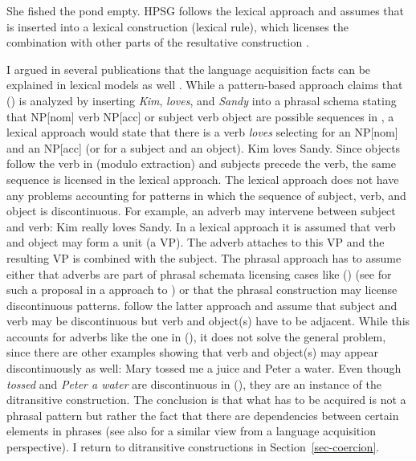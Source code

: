 \documentclass[output=paper,biblatex,babelshorthands,newtxmath,draftmode,colorlinks,citecolor=brown]{langscibook}
\begin{document}
\ea
She fished the pond empty.
\z
HPSG follows the lexical approach and assumes that  is inserted into a lexical
construction (lexical rule), which licenses the combination with other parts of the resultative
construction \citep[Section~5.2]{Mueller2002b}.

I argued in several publications that the language acquisition facts can be explained in lexical
models as well \parencites[Section~6.3]{MuellerPersian}[Section~9]{MWArgSt}. While a pattern-based approach claims that () is
analyzed by inserting \emph{Kim}, \emph{loves}, and \emph{Sandy} into a phrasal schema stating that
NP[nom] verb NP[acc] or subject verb object are possible sequences in , a lexical approach
would state that there is a verb \emph{loves} selecting for an NP[nom] and an NP[acc] (or for a
subject and an object).
\ea
Kim loves Sandy.
\z
Since objects follow the verb in  (modulo extraction) and subjects precede the verb, the same
sequence is licensed in the lexical approach. The lexical approach does not have any problems
accounting for patterns in which the sequence of subject, verb, and object is discontinuous. For
example, an adverb may intervene between subject and verb:
\ea
Kim really loves Sandy.
\z
In a lexical approach it is assumed that verb and object may form a unit (a VP). The adverb attaches
to this VP and the resulting VP is combined with the subject. The phrasal approach has to assume
either that adverbs are part of phrasal schemata licensing cases like () (see
\citealt[Section~6.3.2]{Uszkoreit87a} for such a proposal in a \gpsg approach to ) or that the phrasal
construction may license discontinuous patterns. \citet[]{BC2005a} follow the latter approach and
assume that subject and verb may be discontinuous but verb and object(s) have to be adjacent. While
this accounts for adverbs like the one in (), it does not solve the general problem, since
there are other examples showing that verb and object(s) may appear discontinuously as well:
\ea
Mary tossed me a juice and Peter a water.
\z
Even though \emph{tossed} and \emph{Peter a water} are discontinuous in (), they are an
instance of the ditransitive construction. The conclusion is that what has to be acquired is not a phrasal pattern but rather the fact that
there are dependencies between certain elements in phrases (see also
\citealt{Behrens2009a} for a similar view from a language acquisition perspective). I return to ditransitive
constructions in Section~\ref{sec-coercion}.%
\end{document}
